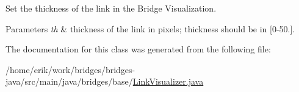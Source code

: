 Set the thickness of the link in the Bridge Visualization. 


\begin{DoxyParams}{Parameters}
{\em th} & thickness of the link in pixels; thickness should be in \mbox{[}0-\/50.\mbox{]}. \\
\hline
\end{DoxyParams}


The documentation for this class was generated from the following file\+:\begin{DoxyCompactItemize}
\item 
/home/erik/work/bridges/bridges-\/java/src/main/java/bridges/base/\hyperlink{_link_visualizer_8java}{Link\+Visualizer.\+java}\end{DoxyCompactItemize}
